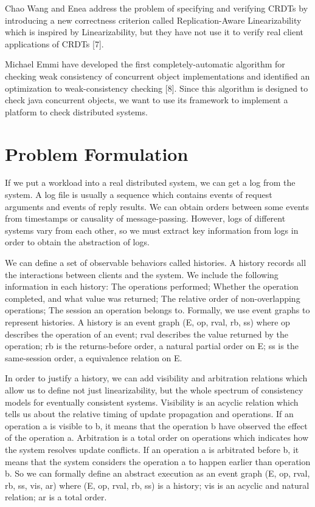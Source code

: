 \documentclass[sigconf,review,screen,anonymous]{acmart}
\begin{document}
Chao Wang and Enea address the problem of specifying and verifying CRDTs by introducing a new correctness criterion called Replication-Aware Linearizability which is inspired by Linearizability, but they have not use it to verify real client applications of CRDTs [7].

Michael Emmi have developed the first completely-automatic algorithm for checking weak consistency of concurrent object implementations and identified an optimization to weak-consistency checking [8]. Since this algorithm is designed to check java concurrent objects, we want to use its framework to implement a platform to check distributed systems.

\section{Problem Formulation}
If we put a workload into a real distributed system, we can get a log from the system. A log file is usually a sequence which contains events of request arguments and events of reply results. We can obtain orders between some events from timestamps or causality of message-passing. However, logs of different systems vary from each other, so we must extract key information from logs in order to obtain the abstraction of logs.

We can define a set of observable behaviors called histories. A history records all the interactions between clients and the system. We include the following information in each history: The operations performed; Whether the operation completed, and what value was returned; The relative order of non-overlapping operations; The session an operation belongs to. Formally, we use event graphs to represent histories. A history is an event graph (E, op, rval, rb, ss) where op describes the operation of an event; rval describes the value returned by the operation; rb is the returns-before order, a natural partial order on E; ss is the same-session order, a equivalence relation on E. 

In order to justify a history, we can add visibility and arbitration relations which allow us to define not just linearizability, but the whole spectrum of consistency models for eventually consistent systems. Visibility is an acyclic relation which tells us about the relative timing of update propagation and operations. If an operation a is visible to b, it means that the operation b have observed the effect of the operation a. Arbitration is a total order on operations which indicates how the system resolves update conflicts. If an operation a is arbitrated before b, it means that the system considers the operation a to happen earlier than operation b. So we can formally define an abstract execution as an event graph (E, op, rval, rb, ss, vis, ar) where (E, op, rval, rb, ss) is a history; vis is an acyclic and natural relation; ar is a total order.
\end{document}
